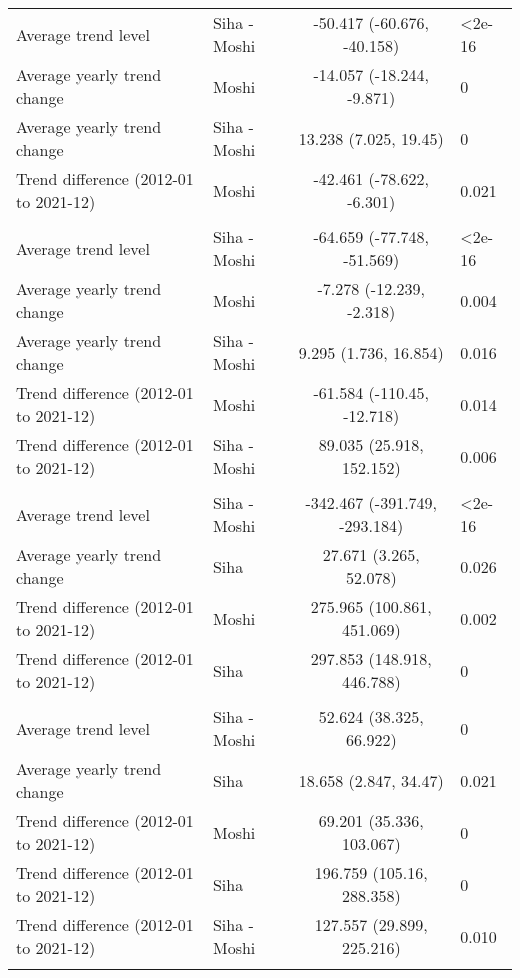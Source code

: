 \begin{longtable}{l|lcl}
\midrule\addlinespace[2.5pt]
Average trend level & Siha - Moshi & -50.417 (-60.676, -40.158) & <2e-16 \\ 
Average yearly trend change & Moshi & -14.057 (-18.244, -9.871) & 0 \\ 
Average yearly trend change & Siha - Moshi & 13.238 (7.025, 19.45) & 0 \\ 
Trend difference (2012-01 to 2021-12) & Moshi & -42.461 (-78.622, -6.301) & 0.021 \\ 
\midrule\addlinespace[2.5pt]
\multicolumn{4}{l}{Fractures} \\ 
\midrule\addlinespace[2.5pt]
Average trend level & Siha - Moshi & -64.659 (-77.748, -51.569) & <2e-16 \\ 
Average yearly trend change & Moshi & -7.278 (-12.239, -2.318) & 0.004 \\ 
Average yearly trend change & Siha - Moshi & 9.295 (1.736, 16.854) & 0.016 \\ 
Trend difference (2012-01 to 2021-12) & Moshi & -61.584 (-110.45, -12.718) & 0.014 \\ 
Trend difference (2012-01 to 2021-12) & Siha - Moshi & 89.035 (25.918, 152.152) & 0.006 \\ 
\midrule\addlinespace[2.5pt]
\multicolumn{4}{l}{Hypertension} \\ 
\midrule\addlinespace[2.5pt]
Average trend level & Siha - Moshi & -342.467 (-391.749, -293.184) & <2e-16 \\ 
Average yearly trend change & Siha & 27.671 (3.265, 52.078) & 0.026 \\ 
Trend difference (2012-01 to 2021-12) & Moshi & 275.965 (100.861, 451.069) & 0.002 \\ 
Trend difference (2012-01 to 2021-12) & Siha & 297.853 (148.918, 446.788) & 0 \\ 
\midrule\addlinespace[2.5pt]
\multicolumn{4}{l}{Infectious Eye Disease} \\ 
\midrule\addlinespace[2.5pt]
Average trend level & Siha - Moshi & 52.624 (38.325, 66.922) & 0 \\ 
Average yearly trend change & Siha & 18.658 (2.847, 34.47) & 0.021 \\ 
Trend difference (2012-01 to 2021-12) & Moshi & 69.201 (35.336, 103.067) & 0 \\ 
Trend difference (2012-01 to 2021-12) & Siha & 196.759 (105.16, 288.358) & 0 \\ 
Trend difference (2012-01 to 2021-12) & Siha - Moshi & 127.557 (29.899, 225.216) & 0.010 \\ 
\midrule\addlinespace[2.5pt]

\end{longtable}
